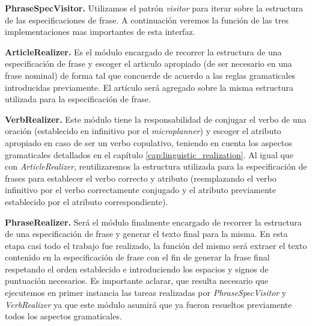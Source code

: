 \bigskip
\noindent
\textbf{PhraseSpecVisitor.} Utilizamos el patrón \textit{visitor} \cite{gof} para iterar sobre la estructura de las especificaciones de frase. A continuación veremos la función de las tres implementaciones mas importantes de esta interfaz. 

\bigskip
\noindent
\textbf{ArticleRealizer.} Es el módulo encargado de recorrer la estructura de una especificación de frase y escoger el articulo apropiado (de ser necesario en una frase nominal) de forma tal que concuerde de acuerdo a las reglas gramaticales introducidas previamente. El artículo será agregado sobre la misma estructura utilizada para la especificación de frase.

\bigskip
\noindent
\textbf{VerbRealizer.} Este módulo tiene la responsabilidad de conjugar el verbo de una oración (establecido en infinitivo por el \textit{microplanner}) y escoger el atributo apropiado en caso de ser un verbo copulativo, teniendo en cuenta los aspectos gramaticales detallados en el capítulo \ref{cap:linguistic_realization}. Al igual que con \textit{ArticleRealizer}, reutilizaremos la estructura utilizada para la especificación de frases para establecer el verbo correcto y atributo (reemplazando el verbo infinitivo por el verbo correctamente conjugado y el atributo previamente establecido por el atributo correspondiente).

\bigskip
\noindent
\textbf{PhraseRealizer.} Será el módulo finalmente encargado de recorrer la estructura de una especificación de frase y generar el texto final para la misma. En esta etapa casi todo el trabajo fue realizado, la función del mismo será extraer el texto contenido en la especificación de frase con el fin de generar la frase final respetando el orden establecido e introduciendo los espacios y signos de puntuación necesarios. Es importante aclarar, que resulta necesario que ejecutemos en primer instancia las tareas realizadas por \textit{PhraseSpecVisitor} y \textit{VerbRealizer} ya que este módulo asumirá que ya fueron resueltos previamente todos los aspectos gramaticales.